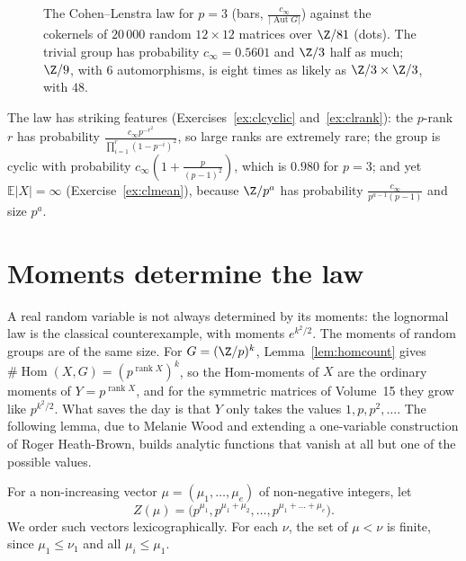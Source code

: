 \begin{figure}[ht]
\centering{}
\caption{The Cohen--Lenstra law for $p=3$ (bars, $\frac{c_\infty}{|\operatorname{Aut}G|}$) against the cokernels of $20\,000$ random $12\times12$ matrices over $\Z/81$ (dots). The trivial group has probability $c_\infty=0.5601$ and $\Z/3$ half as much; $\Z/9$, with $6$ automorphisms, is eight times as likely as $\Z/3\times\Z/3$, with $48$.}
\label{fig:cokernels}
\end{figure}

The law has striking features (Exercises~\ref{ex:clcyclic} and~\ref{ex:clrank}): the $p$-rank $r$ has probability $\frac{c_\infty p^{-r^2}}{\prod_{i=1}^r(1-p^{-i})^2}$, so large ranks are extremely rare; the group is cyclic with probability $c_\infty(1+\frac p{(p-1)^2})$, which is $0.980$ for $p=3$; and yet $\mathbb E|X|=\infty$ (Exercise~\ref{ex:clmean}), because $\Z/p^a$ has probability $\frac{c_\infty}{p^{a-1}(p-1)}$ and size $p^a$.

\section{Moments determine the law}

A real random variable is not always determined by its moments: the lognormal law is the classical counterexample, with moments $e^{k^2/2}$. The moments of random groups are of the same size. For $G=(\Z/p)^k$, Lemma~\ref{lem:homcount} gives $\#\operatorname{Hom}(X,G)=(p^{\operatorname{rank}X})^k$, so the Hom-moments of $X$ are the ordinary moments of $Y=p^{\operatorname{rank}X}$, and for the symmetric matrices of Volume~15 they grow like $p^{k^2/2}$. What saves the day is that $Y$ only takes the values $1,p,p^2,\dots$. The following lemma, due to Melanie Wood and extending a one-variable construction of Roger Heath-Brown, builds analytic functions that vanish at all but one of the possible values.

For a non-increasing vector $\mu=(\mu_1,\dots,\mu_e)$ of non-negative integers, let\[Z(\mu)=\bigl(p^{\mu_1},p^{\mu_1+\mu_2},\dots,p^{\mu_1+\dots+\mu_e}\bigr).\] We order such vectors lexicographically. For each $\nu$, the set of $\mu<\nu$ is finite, since $\mu_1\le\nu_1$ and all $\mu_i\le\mu_1$.


